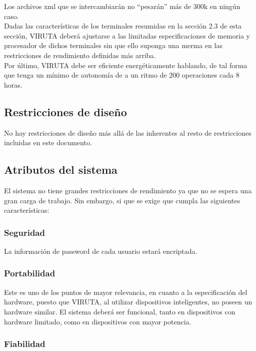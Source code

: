 Los archivos xml que se intercambiarán no ``pesarán'' más de 300k en ningún caso.\\

Dadas las características de los terminales resumidas en la sección 2.3 de esta sección, VIRUTA deberá ajustarse a las limitadas especificaciones de memoria y procesador de dichos terminales sin que ello suponga una merma en las restricciones de rendimiento definidas más arriba.\\

Por último, VIRUTA debe ser eficiente energéticamente hablando, de tal forma que tenga un mínimo de autonomía de  a un ritmo de 200 operaciones cada 8 horas.

\subsection{Restricciones de diseño}

No hay restricciones de diseño más allá de las inherentes al resto de restricciones incluidas en este documento.

\subsection{Atributos del sistema}

El sistema no tiene grandes restricciones de rendimiento ya que no se espera una gran carga de trabajo. Sin embargo, si que se exige que cumpla las siguientes características:

\subsubsection{Seguridad}

La información de password de cada usuario estará encriptada.

\subsubsection{Portabilidad}

Este es uno de los puntos de mayor relevancia, en cuanto a la especificación del hardware, puesto que VIRUTA, al utilizar dispositivos inteligentes, no poseen un hardware similar. El sistema deberá ser funcional, tanto en dispositivos con hardware limitado, como en dispositivos con mayor potencia.




\subsubsection{Fiabilidad}

